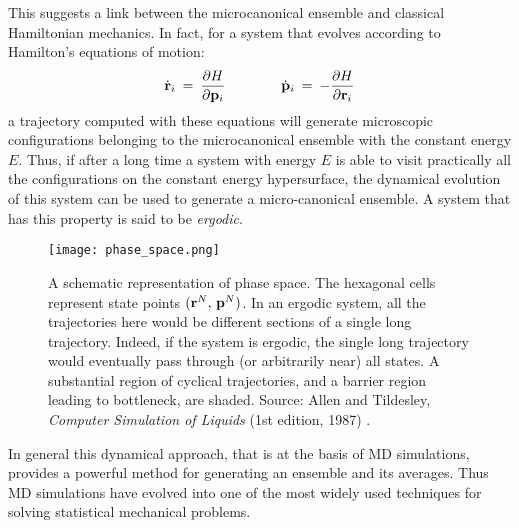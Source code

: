 This suggests a link between the microcanonical ensemble and classical Hamiltonian mechanics. In fact, for a system that evolves according to Hamilton's equations of motion:
\begin{equation}\label{eq:hamilton}
\dot{\bold{r}}_i \:=\: \frac{\partial H}{\partial \bold{p}_i} \qquad \qquad \dot{\bold{p}}_i \:=\: - \frac{\partial H}{\partial \bold{r}_i}
\end{equation}
a trajectory computed with these equations will generate microscopic configurations belonging to the microcanonical ensemble with the constant energy $E$. Thus, if after a long time a system with energy $E$ is able to visit practically all the configurations on the constant energy hypersurface, the dynamical evolution of this system can be used to generate a micro-canonical ensemble. A system that has this property is said to be \textit{ergodic}.

\begin{figure}[H]
\centering
\begin{minipage}[t]{0.8\textwidth}
	\centering
    \texttt{[image: phase\_space.png]}
    
    \footnotesize{\caption{A schematic representation of phase space. The hexagonal cells represent state points $( \bold{r}^N, \, \bold{p}^N )$. In an ergodic system, all the trajectories here would be different sections of a single long trajectory. Indeed, if the system is ergodic, the single long trajectory would eventually pass through (or arbitrarily near) all states. A substantial region of cyclical trajectories, and a barrier region leading to bottleneck, are shaded. 
    Source: Allen and Tildesley, \textit{Computer Simulation of Liquids} (1st edition, 1987) 
    \cite{ref:AllenTildesley_1ed}.}
    \label{fig:Value-Added-Cocaine-Sales}
    }
\end{minipage} 
\end{figure}

In general this dynamical approach, that is at the basis of MD simulations, provides a powerful method for generating an ensemble and its averages. Thus MD simulations have evolved into one of the most widely used techniques for solving statistical mechanical problems.

